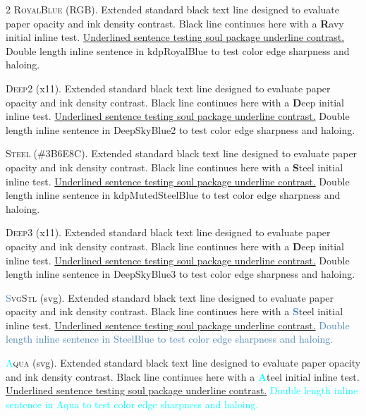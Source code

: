 \begin{multicols}{2}
\lettrine[lines=2]{\textcolor{kdpRoyalBlue}{R}}{oyalBlue} (RGB). Extended standard black text line designed to evaluate paper opacity and ink density contrast. Black line continues here with a \textbf{\textcolor{kdpRoyalBlue}{R}}avy initial inline test. \ul{Underlined sentence testing soul package underline contrast.} \textcolor{kdpRoyalBlue}{Double length inline sentence in kdpRoyalBlue to test color edge sharpness and haloing.}


\lettrine[lines=2]{\textcolor{DeepSkyBlue2}{D}}{eep2} (x11). Extended standard black text line designed to evaluate paper opacity and ink density contrast. Black line continues here with a \textbf{\textcolor{DeepSkyBlue2}{D}}eep initial inline test. \ul{Underlined sentence testing soul package underline contrast.} \textcolor{DeepSkyBlue2}{Double length inline sentence in DeepSkyBlue2 to test color edge sharpness and haloing.}


\lettrine[lines=2]{\textcolor{kdpMutedSteelBlue}{S}}{teel} (\#3B6E8C). Extended standard black text line designed to evaluate paper opacity and ink density contrast. Black line continues here with a \textbf{\textcolor{kdpMutedSteelBlue}{S}}teel initial inline test. \ul{Underlined sentence testing soul package underline contrast.} \textcolor{kdpMutedSteelBlue}{Double length inline sentence in kdpMutedSteelBlue to test color edge sharpness and haloing.}


\lettrine[lines=2]{\textcolor{DeepSkyBlue3}{D}}{eep3} (x11). Extended standard black text line designed to evaluate paper opacity and ink density contrast. Black line continues here with a \textbf{\textcolor{DeepSkyBlue3}{D}}eep initial inline test. \ul{Underlined sentence testing soul package underline contrast.} \textcolor{DeepSkyBlue3}{Double length inline sentence in DeepSkyBlue3 to test color edge sharpness and haloing.}


\lettrine[lines=2]{\textcolor{SteelBlue}{S}}{vgStl} (svg). Extended standard black text line designed to evaluate paper opacity and ink density contrast. Black line continues here with a \textbf{\textcolor{SteelBlue}{S}}teel initial inline test. \ul{Underlined sentence testing soul package underline contrast.} \textcolor{SteelBlue}{Double length inline sentence in SteelBlue to test color edge sharpness and haloing.}


\lettrine[lines=2]{\textcolor{Aqua}{A}}{qua} (svg). Extended standard black text line designed to evaluate paper opacity and ink density contrast. Black line continues here with a \textbf{\textcolor{Aqua}{A}}teel initial inline test. \ul{Underlined sentence testing soul package underline contrast.} \textcolor{Aqua}{Double length inline sentence in Aqua to test color edge sharpness and haloing.}



\end{multicols}

